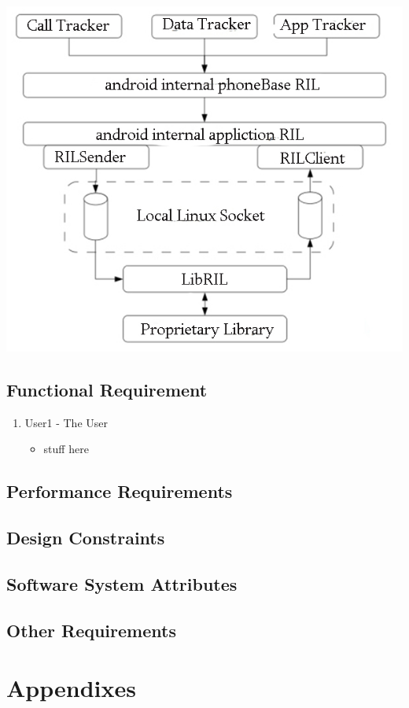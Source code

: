 \documentclass[11pt]{article}
\begin{document}
				\includegraphics[width=0.5\linewidth]{Images/software.jpg}\\[0.5cm]
						

		\subsection{Functional Requirement}

			\begin{enumerate}
					\item User1 - The User
					\begin{itemize}
						\item stuff here
					\end{itemize}
			\end{enumerate}
		\subsection{Performance Requirements}

		\subsection{Design Constraints}

		\subsection{Software System Attributes}

		\subsection{Other Requirements}

	\section{Appendixes}


	
\end{document}
